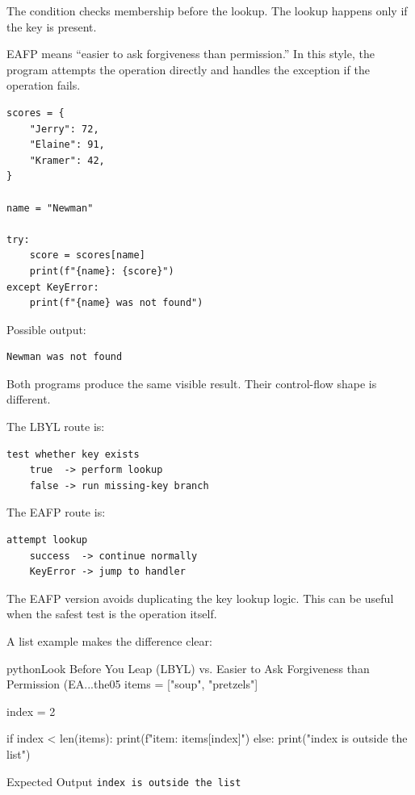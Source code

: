 \documentclass[a4paper,twoside]{report}
\begin{document}
The condition checks membership before the lookup. The lookup happens only if the key is present.

EAFP means ``easier to ask forgiveness than permission.'' In this style, the program attempts the operation directly and handles the exception if the operation fails.

\begin{verbatim}
scores = {
    "Jerry": 72,
    "Elaine": 91,
    "Kramer": 42,
}

name = "Newman"

try:
    score = scores[name]
    print(f"{name}: {score}")
except KeyError:
    print(f"{name} was not found")
\end{verbatim}

Possible output:

\begin{verbatim}
Newman was not found
\end{verbatim}

Both programs produce the same visible result. Their control-flow shape is different.

The LBYL route is:

\begin{verbatim}
test whether key exists
    true  -> perform lookup
    false -> run missing-key branch
\end{verbatim}

The EAFP route is:

\begin{verbatim}
attempt lookup
    success  -> continue normally
    KeyError -> jump to handler
\end{verbatim}

The EAFP version avoids duplicating the key lookup logic. This can be useful when the safest test is the operation itself.

A list example makes the difference clear:

\begin{codebox}[]{python}{Look Before You Leap (LBYL) vs. Easier to Ask Forgiveness than Permission (EA...}{the05}
items = ["soup", "pretzels"]

index = 2

if index < len(items):
    print(f"item: {items[index]}")
else:
    print("index is outside the list")
\end{codebox}


\begin{iobox}{Expected Output}
\texttt{index is outside the list} \\
\end{iobox}
\end{document}
